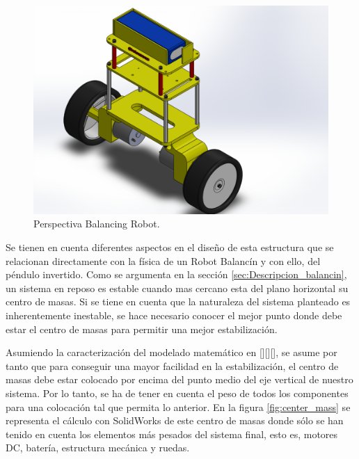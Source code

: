 \begin{center}
	\begin{figure}[H]
		\center
		\includegraphics[trim = 20mm 0mm 8cm 0mm,clip, angle=0, scale = 0.5]{imagenes/Balancing_Robot/EnsanBalanceCab.PDF}
		\caption{Perspectiva Balancing Robot.}
		\label{fig:EnsanBalanceCab}
	\end{figure}
\end{center}

Se tienen en cuenta diferentes aspectos en el diseño de esta estructura que se relacionan directamente con la física de un Robot Balancín y con ello, del péndulo invertido. \newline
Como se argumenta en la sección \ref{sec:Descripcion_balancin}, un sistema en reposo es estable cuando mas cercano esta del plano horizontal su centro de masas. Si se tiene en cuenta que la naturaleza del sistema planteado es inherentemente inestable, se hace necesario conocer el mejor punto donde debe estar el centro de masas para permitir una mejor estabilización. \newline

Asumiendo la caracterización del modelado matemático en [][][], se asume por tanto que para conseguir una mayor facilidad en la estabilización, el centro de masas debe estar colocado por encima del punto medio del eje vertical de nuestro sistema. Por lo tanto, se ha de tener en cuenta el peso de todos los componentes para una colocación tal que permita lo anterior. \newline
En la figura \ref{fig:center_mass} se representa el cálculo con SolidWorks de este centro de masas donde sólo se han tenido en cuenta los elementos más pesados del sistema final, esto es, motores DC, batería, estructura mecánica y ruedas. 

